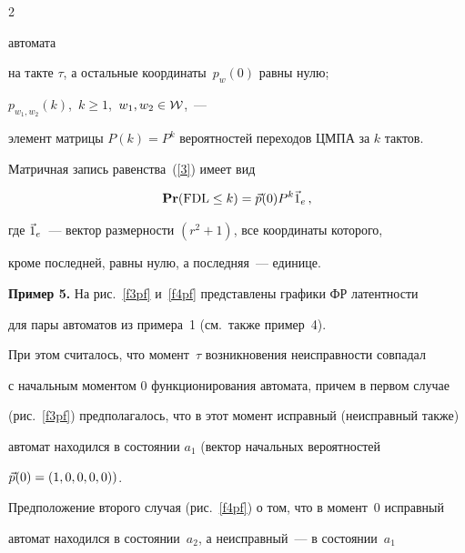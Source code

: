\begin{multicols}{2}
\begin{figure}
\begin{minipage}[t]{81mm}




\end{minipage}


\end{figure}


автомата


на такте $\tau$, а остальные координаты~$p_w(0)$ равны нулю;


$p_{w_1,w_2}(k)$,\ $k \ge 1$,\ $w_1,w_2\in {\cal W}$,~---


элемент матрицы $P(k) = P^k$ вероятностей переходов ЦМПА за $k$ тактов.





 Матричная запись равенства~(\ref{3}) имеет вид


$$


{\bf Pr}(\mathrm{FDL} \le k) = \v p(0) P^{k} \v 1_e\,,


$$


где $\vec 1_e$~--- вектор размерности $(r^2 + 1)$, все координаты которого,


кроме последней, равны нулю, а последняя~--- единице.





\medskip


\noindent


{\bf Пример 5.} На рис.~\ref{f3pf} и~\ref{f4pf} представлены графики ФР латентности


для пары автоматов из примера~1 (см.\ также пример~4).


При этом считалось, что момент~$\tau$ возникновения неисправности совпадал


с начальным моментом 0 функционирования автомата, причем в первом случае


(рис.~\ref{f3pf}) предполагалось, что в этот момент исправный (неисправный также)


автомат находился в состоянии $a_1$ (вектор начальных вероятностей


$\vec p(0)=(1,0,0,0,0))$.


Предположение второго случая (рис.~\ref{f4pf}) о том, что в момент~0 исправный


автомат находился в со\-сто\-янии~$a_2$, а неисправный~--- в со\-сто\-янии~$a_1$



\end{multicols}
